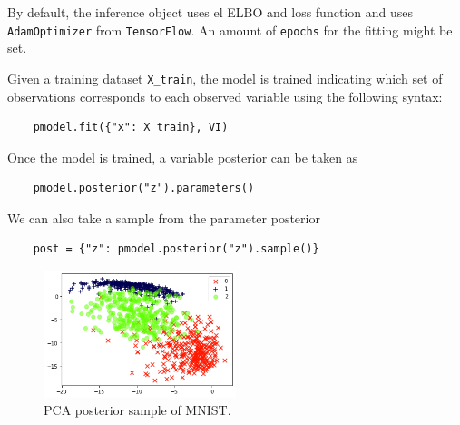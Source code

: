 By default, the inference object uses el ELBO and loss function and uses \texttt{AdamOptimizer} from \texttt{TensorFlow}. An amount of \texttt{epochs} for the fitting might be set.

Given a training dataset \texttt{X\_train}, the model is trained indicating which set of observations corresponds to each observed variable using the following syntax:
\begin{verbatim}
    pmodel.fit({"x": X_train}, VI)
\end{verbatim}

Once the model is trained, a variable posterior can be taken as
\begin{verbatim}
    pmodel.posterior("z").parameters()
\end{verbatim}

We can also take a sample from the parameter posterior 
\begin{verbatim}
    post = {"z": pmodel.posterior("z").sample()}
\end{verbatim}

\begin{figure}[h!]
    \centering
    \includegraphics[width=0.5\textwidth]{tex/images/pca_mnist.png}
    \caption{PCA posterior sample of MNIST.}
\end{figure}
